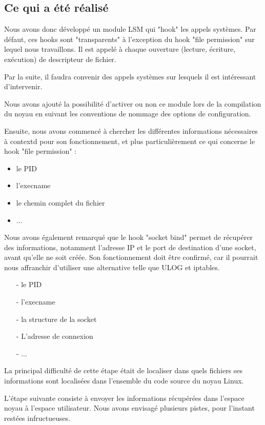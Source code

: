 \documentclass[pdftex,a4paper,titlepage,11pt,openright]{article}
\begin{document}
\newpage

\subsection{Ce qui a été réalisé}

Nous avons donc développé un module LSM qui "hook" les appels systèmes. Par défaut, ces hooks sont "transparents" à l'exception du hook "file permission" sur lequel nous travaillons. Il est appelé à chaque ouverture (lecture, écriture, exécution) de descripteur de fichier.

Par la suite, il faudra convenir des appels systèmes sur lesquels il est intéressant d'intervenir.

Nous avons ajouté la possibilité d'activer ou non ce module lors de la compilation du noyau en suivant les conventions de nommage des options de configuration.

Ensuite, nous avons commencé à chercher les différentes informations nécessaires à contextd pour son fonctionnement, et plus particulièrement ce qui concerne le hook "file permission" :
	\begin{itemize}
		\item le PID
		\item l'execname
		\item le chemin complet du fichier
		\item ...
	\end{itemize}

Nous avons également remarqué que le hook "socket bind" permet de récupérer des informations, notamment l'adresse IP et le port de destination d'une socket, avant qu'elle ne soit créée. Son fonctionnement doit être confirmé, car il pourrait nous affranchir d'utiliser une alternative telle que ULOG et iptables.
	\begin{itemize}
		\item[-] le PID
		\item[-] l'execname
		\item[-] la structure de la socket
		\item[-] L'adresse de connexion
		\item[-] ...
	\end{itemize}

La principal difficulté de cette étape était de localiser dans quels fichiers ses informations sont localisées dans l'ensemble du code source du noyau Linux.

L'étape suivante consiste à envoyer les informations récupérées dans l'espace noyau à l'espace utilisateur. Nous avons envisagé plusieurs pistes, pour l'instant restées infructueuses.
\end{document}
